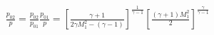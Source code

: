 \documentclass[10pt]{article}
\begin{document}
\begin{align*}\frac{p_{02}}{p}
=
\frac{p_{02}}{p_{01}} \frac{p_{01}}{p}
=
\left[
\frac{\gamma + 1}{2 \gamma M_{1}^{2} - \left( \gamma -1 \right) }
\right]^{\frac{1}{\gamma-1} }
\left[
\frac{\left( \gamma+1 \right) M_1^2 }{2}
\right]^{\frac{\gamma}{\gamma-1}}\end{align*}
\end{document}
